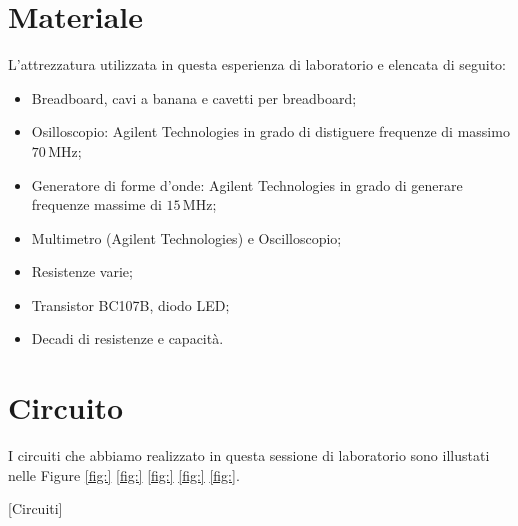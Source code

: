 \section*{Materiale}

L'attrezzatura utilizzata in questa esperienza di laboratorio e elencata di seguito:

\begin{itemize}
    \setlength{\itemsep}{1pt}
    \item{Breadboard, cavi a banana e cavetti per breadboard;}
    \item{Osilloscopio: Agilent Technologies in grado di distiguere frequenze di massimo $70\,\si{\mega\hertz}$;}
    \item{Generatore di forme d'onde: Agilent Technologies in grado di generare frequenze massime di $15\,\si{\mega\hertz}$;}
    \item{Multimetro (Agilent Technologies) e Oscilloscopio;}
    \item{Resistenze varie;}
    \item{Transistor BC107B, diodo LED;}
    \item{Decadi di resistenze e capacità.}
\end{itemize}

\section*{Circuito}

I circuiti che abbiamo realizzato in questa sessione di laboratorio sono illustati nelle Figure \ref{fig:} \ref{fig:} \ref{fig:} \ref{fig:} \ref{fig:}.

[Circuiti]
